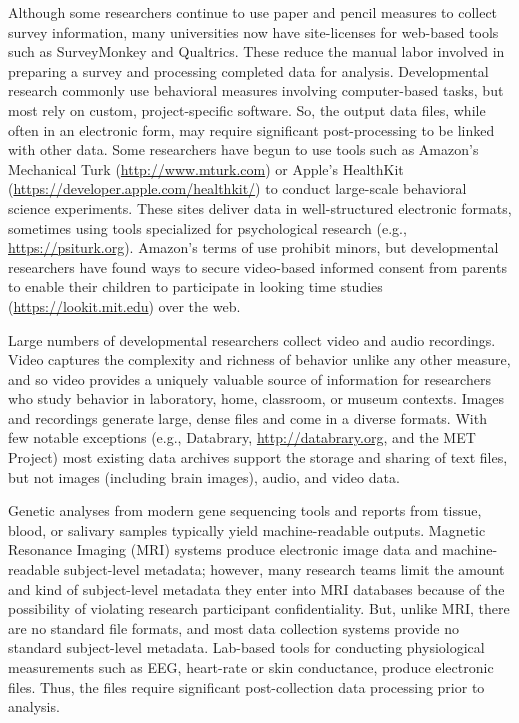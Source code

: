 \documentclass[letterpaper,man,apacite,natbib]{apa6}
\begin{document}
Although some researchers continue to use paper and pencil measures to collect survey information, many universities now have site-licenses for web-based tools such as SurveyMonkey and Qualtrics.
These reduce the manual labor involved in preparing a survey and processing completed data for analysis. 
Developmental research commonly use behavioral measures involving computer-based tasks, but most rely on custom, project-specific software.
So, the output data files, while often in an electronic form, may require significant post-processing to be linked with other data.
Some researchers have begun to use tools such as Amazon's Mechanical Turk (\url{http://www.mturk.com}) or Apple's HealthKit (\url{https://developer.apple.com/healthkit/}) to conduct large-scale behavioral science experiments.
These sites deliver data in well-structured electronic formats, sometimes using tools specialized for psychological research (e.g., \url{https://psiturk.org}).
Amazon's terms of use prohibit minors, but developmental researchers have found ways to secure video-based informed consent from parents to enable their children to participate in looking time studies (\url{https://lookit.mit.edu}) over the web.

Large numbers of developmental researchers collect video and audio recordings.
Video captures the complexity and richness of behavior unlike any other measure, and so video provides a uniquely valuable source of information for researchers who study behavior in laboratory, home, classroom, or museum contexts. 
Images and recordings generate large, dense files and come in a diverse formats.
With few notable exceptions (e.g., Databrary, \url{http://databrary.org}, and the MET Project) most existing data archives support the storage and sharing of text files, but not images (including brain images), audio, and video data.

Genetic analyses from modern gene sequencing tools and reports from tissue, blood, or salivary samples typically yield machine-readable outputs.
Magnetic Resonance Imaging (MRI) systems produce electronic image data and machine-readable subject-level metadata; however, many research teams limit the amount and kind of subject-level metadata they enter into MRI databases because of the possibility of violating research participant confidentiality.
But, unlike MRI, there are no standard file formats, and most data collection systems provide no standard subject-level metadata.
Lab-based tools for conducting physiological measurements such as EEG, heart-rate or skin conductance, produce electronic files.
Thus, the files require significant post-collection data processing prior to analysis. 
\end{document}

